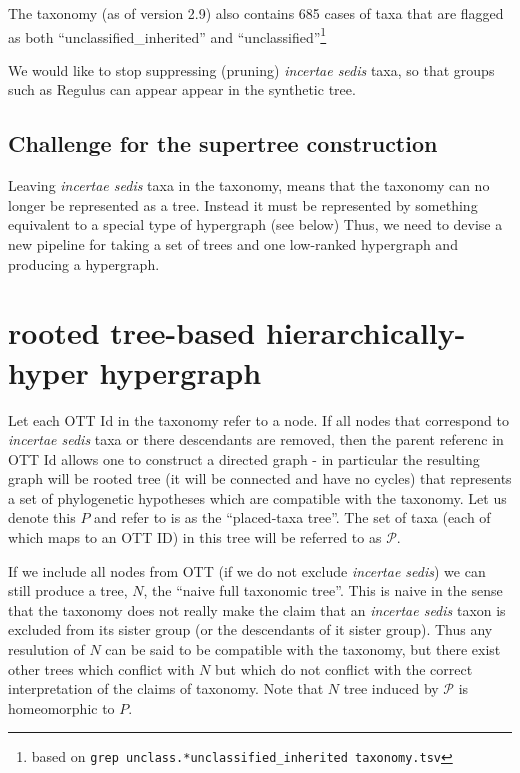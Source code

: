 \documentclass[11pt]{article}
\newcommand{\insed}{{\em incertae sedis}\xspace}
\newcommand{\specialHypergraph}{rooted tree-based hierarchically-hyper hypergraph \xspace}
\newcommand{\placedTaxa}{\ensuremath{\mathcal{P}}\xspace}
\newcommand{\placedTaxoTree}{\ensuremath{P}\xspace}
\newcommand{\placedTaxoTreeName}{placed-taxa tree\xspace}
\newcommand{\naiveFullTree}{\ensuremath{N}\xspace}
\newcommand{\naiveFullTreeName}{naive full taxonomic tree\xspace}
\begin{document}
The taxonomy (as of version 2.9) also contains 685 cases of taxa that are flagged as both
    ``unclassified\_inherited'' and  ``unclassified''\footnote{based on {\tt grep unclass.*unclassified\_inherited taxonomy.tsv}}

We would like to stop suppressing (pruning) \insed taxa, so that groups such as Regulus can appear
    appear in the synthetic tree.

\subsection{Challenge for the supertree construction}
Leaving \insed taxa in the taxonomy, means that the taxonomy can no longer be represented as 
    a tree.
Instead it must be represented by something equivalent to a special type of hypergraph (see below)
Thus, we need to devise a new pipeline for taking a set of trees and one low-ranked hypergraph and
    producing a hypergraph.

\section{\specialHypergraph}
Let each OTT Id in the taxonomy refer to a node.
If all nodes that correspond to \insed taxa or there descendants are removed,
    then the parent referenc in OTT Id allows one to construct 
    a directed graph - in particular the resulting graph will be rooted tree (it will be connected
    and have no cycles) that represents a set of phylogenetic hypotheses  which are compatible
    with the taxonomy.
Let us denote this \placedTaxoTree and refer to is as the ``\placedTaxoTreeName''.
The set of taxa (each of which maps to an OTT ID) in this tree will be referred to as \placedTaxa.

If we include all nodes from OTT (if we do not exclude \insed) we can still produce
    a tree,  \naiveFullTree, the ``\naiveFullTreeName''.
This is naive in the sense that the taxonomy does not really make the claim that an \insed
    taxon is excluded from its sister group (or the descendants of it sister group). 
Thus any resulution of \naiveFullTree can be said to be compatible with the taxonomy, but there
    exist other trees which conflict with \naiveFullTree but which do not conflict with
    the correct interpretation of the claims of taxonomy.
Note that \naiveFullTree tree induced by \placedTaxa is homeomorphic to \placedTaxoTree.


\end{document}
